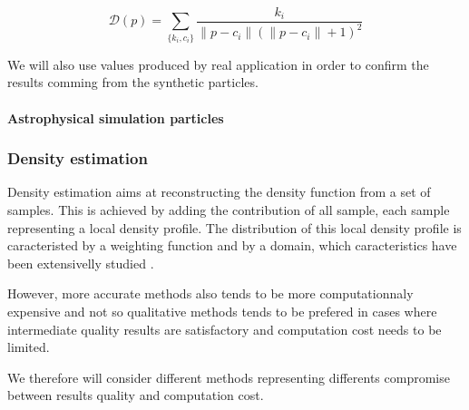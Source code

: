 \documentclass[10pt,a4paper,twoside,twocolumn]{article}
\newcommand*{\rootPath}{../}
\begin{document}
\begin{equation}
	\mathcal D(p) = \sum_{\{k_i, c_i\}} \frac{k_i}{\|p-c_i\|(\|p-c_i\|+1)^2}
\end{equation}

We will also use values produced by real application in order to confirm the
results comming from the synthetic particles.

\paragraph{Astrophysical simulation particles}


\subsubsection{Density estimation}

Density estimation aims at reconstructing the density function from a set of
samples. This is achieved by adding the contribution of all sample, each sample
representing a local density profile. The distribution of this local density
profile is caracteristed by a weighting function and by a domain, which
caracteristics have been extensivelly studied
.

However, more accurate methods also tends to be more computationnaly expensive
and not so qualitative methods tends to be prefered in cases where intermediate
quality results are satisfactory and computation cost needs to be limited.

We therefore will consider different methods representing differents compromise
between results quality and computation cost.

\ifstandalone
	
	
\fi
\end{document}
